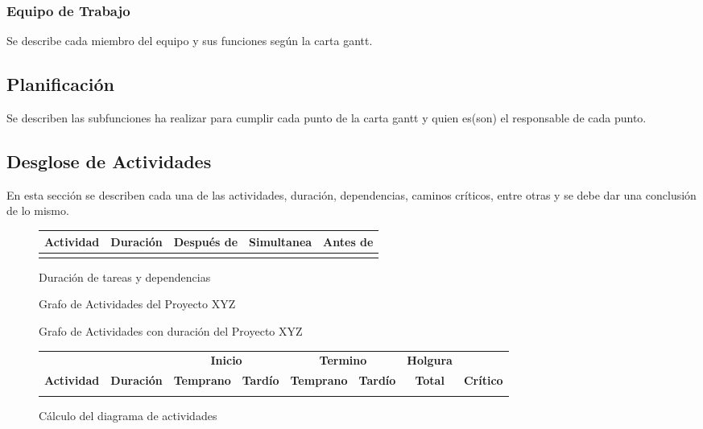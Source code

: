 \documentclass[letter,12pt]{report}
\begin{document}
\subsubsection{Equipo de Trabajo}
Se describe cada miembro del equipo y sus funciones según la carta gantt.

\subsection{Planificación}
Se describen las subfunciones ha realizar para cumplir cada punto de la carta gantt y quien es(son) el responsable de cada punto.

\subsection{Desglose de Actividades}\label{PERT}
En esta sección se describen cada una de las actividades, duración, dependencias, caminos críticos, entre otras y se debe dar una conclusión de lo mismo.
\begin{figure}[hbt]
\begin{tabular}{|c|c|c|c|c|}\hline
  \textbf{Actividad}&\textbf{Duración} &\textbf{Después de} & \textbf{Simultanea} & \textbf{Antes de}\\\hline
& & &&\\\hline

\end{tabular}
  \caption{Duración de tareas y dependencias}
\end{figure}

\begin{landscape}
\begin{figure}[hbt]
  \centering
  \caption{Grafo de Actividades del Proyecto XYZ}
  \label{CPM}
\end{figure}
\end{landscape}

\begin{landscape}
\begin{figure}[hbt]
  \centering
  \caption{Grafo de Actividades con duración del Proyecto XYZ}
  \label{CPMduracion}
\end{figure}
\end{landscape}

\begin{figure}[hbt]
 \begin{tabular}{|c|c|cc|cc|c|c|}\hline
 & & \multicolumn{2}{|c|}{\textbf{Inicio}} & \multicolumn{2}{|c|}{\textbf{Termino}} & \textbf{Holgura} & \\
\textbf{Actividad}& \textbf{Duración}& \textbf{Temprano} &\textbf{Tardío} &\textbf{Temprano} &\textbf{Tardío} &\textbf{Total}  &\textbf{Crítico} \\\hline
& & &   & &   & & \\\hline

\end{tabular}
  \caption{Cálculo del diagrama de actividades}
\end{figure}
\end{document}
